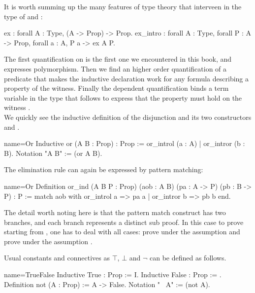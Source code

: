 It is worth summing up the many features of type theory that
interveen in the type of  and :

\begin{coq}{}{}
ex : forall A : Type, (A -> Prop) -> Prop.
ex_intro : forall A : Type, forall P : A -> Prop, forall a : A, P a -> ex A P.
\end{coq}

The first quantification on  is the first one we encountered in this
book, and expresses polymorphism.  Then we find an higher order quantification
of a predicate  that makes the  inductive declaration work
for any formula describing a property of the witness.  Finally
the dependent quantification  binds a term variable
 in the type that follows to express that the property  must hold
on the witness .\\

We quickly see the inductive definition of the disjunction 
and its two constructors  and .

\begin{coq}{name=Or}{}
Inductive or (A B : Prop) : Prop := or_introl (a : A) | or_intror (b : B).
Notation "A \/ B" := (or A B).
\end{coq}

The elimination rule can again be expressed by pattern matching:

\begin{coq}{name=Or}{}
Definition or_ind (A B P : Prop)
  (aob : A \/ B) (pa : A -> P) (pb : B -> P) : P :=
  match aob with or_introl a => pa a | or_intror b => pb b end.
\end{coq}

The detail worth noting here is that the pattern match construct has two
branches, and each branch represents a distinct sub proof.  In this
case to prove  starting from , one has to deal with all
cases: prove  under the assumption  and prove 
under the assumption .

Usual constants and connectives as $\top$, $\bot$ and $\neg$
can be defined as follows.

\begin{coq}{name=TrueFalse}{}
Inductive True : Prop := I.
Inductive False : Prop := .
Definition not (A : Prop) := A -> False.
Notation "~ A" := (not A).
\end{coq}

